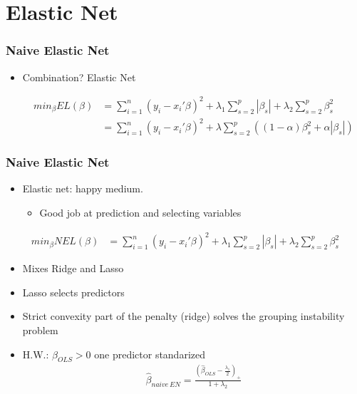 \documentclass[
  shownotes,
  xcolor={svgnames},
  hyperref={colorlinks,citecolor=DarkBlue,linkcolor=DarkRed,urlcolor=DarkBlue}
  , aspectratio=169]{beamer}
\begin{document}
\section{Elastic Net}
 \begin{frame}[fragile]
\frametitle{Naive Elastic Net}

\begin{itemize}
\item  Combination? Elastic Net

\begin{align}
min_{\beta} EL(\beta) &= \sum_{i=1}^n (y_i-x_i'\beta)^2 + \lambda_1 \sum_{s=2}^p |\beta_s| + \lambda_2 \sum_{s=2}^p \beta_s^2 \nonumber \\
 &= \sum_{i=1}^n (y_i-x_i'\beta)^2 + \lambda \sum_{s=2}^p \left(  (1-\alpha) \beta_s^2 + \alpha  |\beta_s|\right)
\end{align}

\end{itemize}
\end{frame}


\begin{frame}[fragile]
\frametitle{Naive Elastic Net}

\begin{itemize}
\item Elastic net: happy medium. 
  \begin{itemize}
    \item Good job at prediction and selecting variables
  \end{itemize}
\end{itemize}

\begin{align}
min_{\beta} NEL(\beta) &= \sum_{i=1}^n (y_i-x_i'\beta)^2 + \lambda_1 \sum_{s=2}^p |\beta_s| + \lambda_2 \sum_{s=2}^p \beta_s^2 
\end{align}


\begin{itemize}
 \item Mixes Ridge and Lasso
 \item Lasso selects predictors
 \item Strict convexity part  of the penalty (ridge) solves the grouping instability problem 
 \scriptsize
 \item H.W.: $\beta_{OLS}>0$ one predictor standarized
 \begin{align}
\hat{\beta}_{naive\,EN}= \frac{\left(\hat{\beta}_{OLS}-\frac{\lambda_1}{2}\right)_{+}}{1+\lambda_2}
\end{align}
\end{itemize}

\end{frame}
\end{document}
